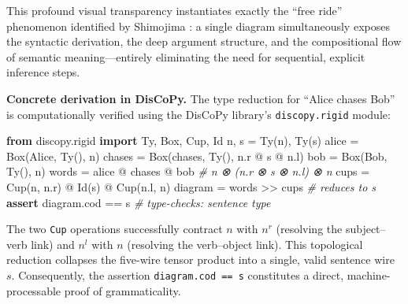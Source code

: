 \documentclass[
]{article}
\newenvironment{Shaded}{}{}
\newcommand{\CommentTok}[1]{\textcolor[rgb]{0.38,0.63,0.69}{\textit{#1}}}
\newcommand{\ControlFlowTok}[1]{\textcolor[rgb]{0.00,0.44,0.13}{\textbf{#1}}}
\newcommand{\ImportTok}[1]{\textcolor[rgb]{0.00,0.50,0.00}{\textbf{#1}}}
\newcommand{\NormalTok}[1]{#1}
\newcommand{\OperatorTok}[1]{\textcolor[rgb]{0.40,0.40,0.40}{#1}}
\newcommand{\StringTok}[1]{\textcolor[rgb]{0.25,0.44,0.63}{#1}}
\begin{document}
This profound visual transparency instantiates exactly the ``free ride''
phenomenon identified by Shimojima \citeyearpar{shimojima1996reasoning}:
a single diagram simultaneously exposes the syntactic derivation, the
deep argument structure, and the compositional flow of semantic
meaning---entirely eliminating the need for sequential, explicit
inference steps.

\textbf{Concrete derivation in DisCoPy.} The type reduction for ``Alice
chases Bob'' is computationally verified using the DisCoPy library's
\texttt{discopy.rigid} module:

\begin{Shaded}
\begin{Highlighting}[]
\ImportTok{from}\NormalTok{ discopy.rigid }\ImportTok{import}\NormalTok{ Ty, Box, Cup, Id}
\NormalTok{n, s }\OperatorTok{=}\NormalTok{ Ty(}\StringTok{\textquotesingle{}n\textquotesingle{}}\NormalTok{), Ty(}\StringTok{\textquotesingle{}s\textquotesingle{}}\NormalTok{)}
\NormalTok{alice }\OperatorTok{=}\NormalTok{ Box(}\StringTok{\textquotesingle{}Alice\textquotesingle{}}\NormalTok{, Ty(), n)}
\NormalTok{chases }\OperatorTok{=}\NormalTok{ Box(}\StringTok{\textquotesingle{}chases\textquotesingle{}}\NormalTok{, Ty(), n.r }\OperatorTok{@}\NormalTok{ s }\OperatorTok{@}\NormalTok{ n.l)}
\NormalTok{bob  }\OperatorTok{=}\NormalTok{ Box(}\StringTok{\textquotesingle{}Bob\textquotesingle{}}\NormalTok{,  Ty(), n)}
\NormalTok{words }\OperatorTok{=}\NormalTok{ alice }\OperatorTok{@}\NormalTok{ chases }\OperatorTok{@}\NormalTok{ bob          }\CommentTok{\# n ⊗ (n.r ⊗ s ⊗ n.l) ⊗ n}
\NormalTok{cups  }\OperatorTok{=}\NormalTok{ Cup(n, n.r) }\OperatorTok{@}\NormalTok{ Id(s) }\OperatorTok{@}\NormalTok{ Cup(n.l, n)}
\NormalTok{diagram }\OperatorTok{=}\NormalTok{ words }\OperatorTok{\textgreater{}\textgreater{}}\NormalTok{ cups               }\CommentTok{\# reduces to s}
\ControlFlowTok{assert}\NormalTok{ diagram.cod }\OperatorTok{==}\NormalTok{ s               }\CommentTok{\# type{-}checks: sentence type}
\end{Highlighting}
\end{Shaded}

The two \texttt{Cup} operations successfully contract \(n\) with \(n^r\)
(resolving the subject--verb link) and \(n^l\) with \(n\) (resolving the
verb--object link). This topological reduction collapses the five-wire
tensor product into a single, valid sentence wire \(s\). Consequently,
the assertion \texttt{diagram.cod\ ==\ s} constitutes a direct,
machine-processable proof of grammaticality.
\end{document}
